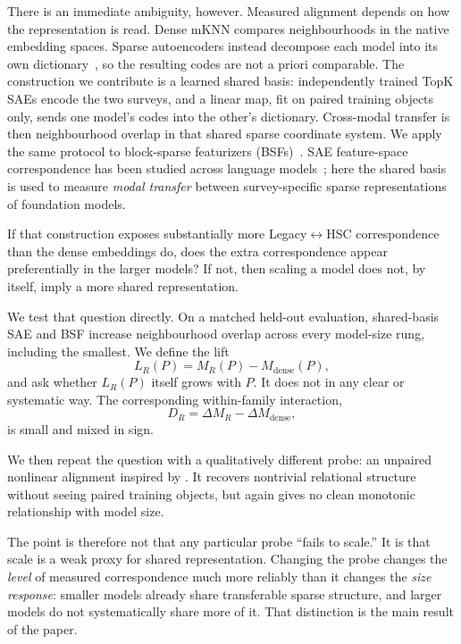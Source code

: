 \documentclass{article}
\begin{document}
There is an immediate ambiguity, however.
Measured alignment depends on how the representation is read.
Dense mKNN compares neighbourhoods in the native embedding spaces.
Sparse autoencoders instead decompose each model into its own dictionary~\citep{gao2025sae}, so the resulting codes are not a priori comparable.
The construction we contribute is a learned shared basis: independently trained TopK SAEs encode the two surveys, and a linear map, fit on paired training objects only, sends one model's codes into the other's dictionary.
Cross-modal transfer is then neighbourhood overlap in that shared sparse coordinate system.
We apply the same protocol to block-sparse featurizers (BSFs)~\citep{fel2026bsf}.
SAE feature-space correspondence has been studied across language models~\citep{lan2024saeuniversality}; here the shared basis is used to measure \emph{modal transfer} between survey-specific sparse representations of foundation models.

If that construction exposes substantially more Legacy\(\leftrightarrow\)HSC correspondence than the dense embeddings do, does the extra correspondence appear preferentially in the larger models?
If not, then scaling a model does not, by itself, imply a more shared representation.

We test that question directly.
On a matched held-out evaluation, shared-basis SAE and BSF increase neighbourhood overlap across every model-size rung, including the smallest.
We define the lift
\[
L_R(P)=M_R(P)-M_{\mathrm{dense}}(P),
\]
and ask whether \(L_R(P)\) itself grows with \(P\).
It does not in any clear or systematic way.
The corresponding within-family interaction,
\[
D_R=\Delta M_R-\Delta M_{\mathrm{dense}},
\]
is small and mixed in sign.

We then repeat the question with a qualitatively different probe: an unpaired nonlinear alignment inspired by \citet{jha2025vec2vec}.
It recovers nontrivial relational structure without seeing paired training objects, but again gives no clean monotonic relationship with model size.

The point is therefore not that any particular probe ``fails to scale.''
It is that scale is a weak proxy for shared representation.
Changing the probe changes the \emph{level} of measured correspondence much more reliably than it changes the \emph{size response}: smaller models already share transferable sparse structure, and larger models do not systematically share more of it.
That distinction is the main result of the paper.
\end{document}
